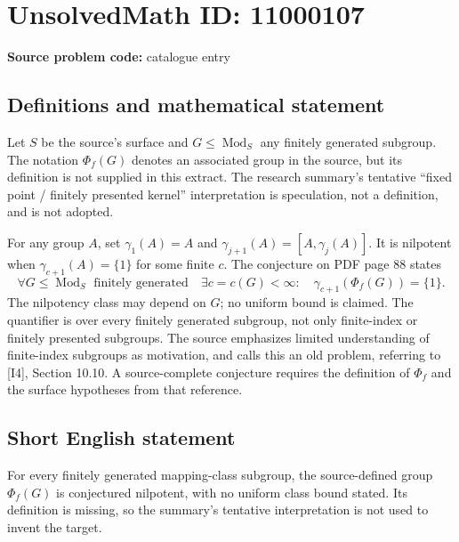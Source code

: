 \documentclass[11pt]{article}
\begin{document}
\section*{UnsolvedMath ID: 11000107}
\textbf{Source problem code:} catalogue entry
\subsection{Definitions and mathematical statement}
Let \(S\) be the source's surface and \(G\le\operatorname{Mod}_S\) any finitely generated subgroup. The notation \(\Phi_f(G)\) denotes an associated group in the source, but its definition is not supplied in this extract. The research summary's tentative ``fixed point / finitely presented kernel'' interpretation is speculation, not a definition, and is not adopted.

For any group \(A\), set \(\gamma_1(A)=A\) and \(\gamma_{j+1}(A)=[A,\gamma_j(A)]\). It is nilpotent when \(\gamma_{c+1}(A)=\{1\}\) for some finite \(c\). The conjecture on PDF page 88 states
\[
 \forall G\le\operatorname{Mod}_S\text{ finitely generated}\quad
 \exists c=c(G)<\infty:\quad
 \gamma_{c+1}(\Phi_f(G))=\{1\}.
\]
The nilpotency class may depend on \(G\); no uniform bound is claimed. The quantifier is over every finitely generated subgroup, not only finite-index or finitely presented subgroups. The source emphasizes limited understanding of finite-index subgroups as motivation, and calls this an old problem, referring to [I4], Section 10.10. A source-complete conjecture requires the definition of \(\Phi_f\) and the surface hypotheses from that reference.
\subsection{Short English statement}
For every finitely generated mapping-class subgroup, the source-defined group \(\Phi_f(G)\) is conjectured nilpotent, with no uniform class bound stated. Its definition is missing, so the summary's tentative interpretation is not used to invent the target.
\end{document}
